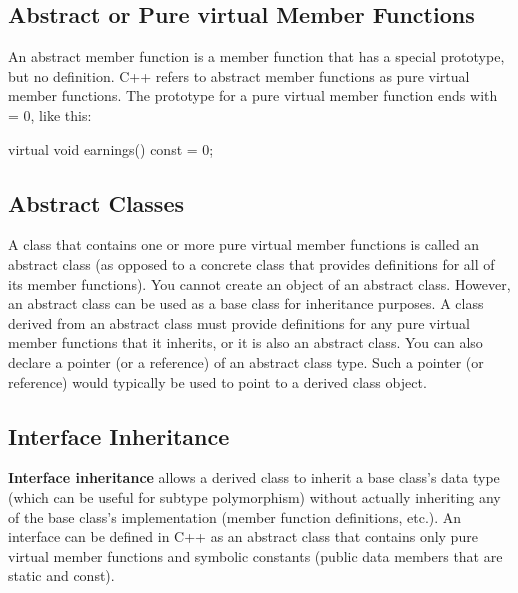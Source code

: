 \documentclass{report}
\begin{document}
    \bigbreak \noindent 
    \subsection{Abstract or Pure virtual Member Functions}
    \bigbreak \noindent 
    An abstract member function is a member function that has a special prototype, but no definition. C++ refers to abstract member functions as pure virtual member functions. The prototype for a pure virtual member function ends with = 0, like this:
    \bigbreak \noindent 
    \begin{cppcode}
        virtual void earnings() const = 0;
    \end{cppcode}
    \bigbreak \noindent 
    \bigbreak \noindent 
    \subsection{Abstract Classes}
    \bigbreak \noindent 
    A class that contains one or more pure virtual member functions is called an abstract class (as opposed to a concrete class that provides definitions for all of its member functions).
    \bigbreak \noindent 
    You cannot create an object of an abstract class. However, an abstract class can be used as a base class for inheritance purposes. A class derived from an abstract class must provide definitions for any pure virtual member functions that it inherits, or it is also an abstract class.
    \bigbreak \noindent 
    You can also declare a pointer (or a reference) of an abstract class type. Such a pointer (or reference) would typically be used to point to a derived class object.
    \bigbreak \noindent 
    \subsection{Interface Inheritance}
    \bigbreak \noindent 
    \textbf{Interface inheritance} allows a derived class to inherit a base class's data type (which can be useful for subtype polymorphism) without actually inheriting any of the base class's implementation (member function definitions, etc.).
    \bigbreak \noindent 
        An interface can be defined in C++ as an abstract class that contains only pure virtual member functions and symbolic constants (public data members that are static and const).
\end{document}
